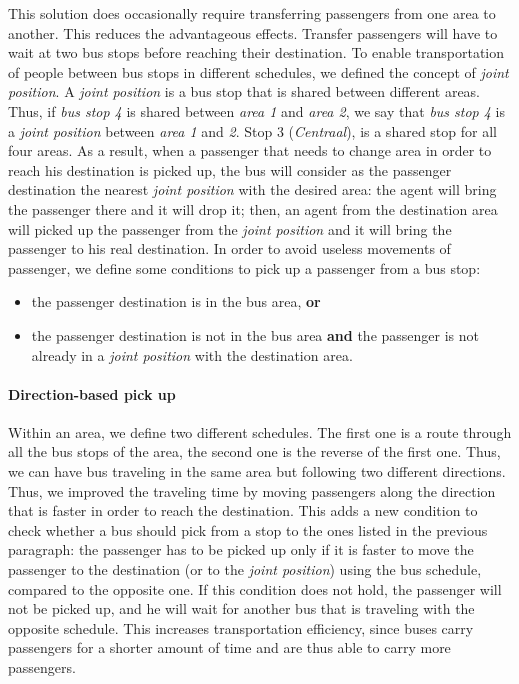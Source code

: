 This solution does occasionally require transferring passengers from one area to another. This reduces the advantageous effects. Transfer passengers will have to wait at two bus stops before reaching their destination. To enable transportation of people between bus stops in different schedules, we defined the concept of \textit{joint position}. A \textit{joint position} is a bus stop that is shared between different areas. Thus, if \textit{bus stop 4} is shared between \textit{area 1} and \textit{area 2}, we say that \textit{bus stop 4} is a \textit{joint position}  between \textit{area 1} and \textit{2}. Stop 3 (\textit{Centraal}), is a shared stop for all four areas. As a result, when a passenger that needs to change area in order to reach his destination is picked up, the bus will consider as the passenger destination the nearest \textit{joint position} with the desired area: the agent will bring the passenger there and it will drop it; then, an agent from the destination area will picked up the passenger from the \textit{joint position} and it will bring the passenger to his real destination. In order to avoid useless movements of passenger, we define some conditions to pick up a passenger from a bus stop:

\begin{itemize}
\item the passenger destination is in the bus area, \textbf{or}
\item the passenger destination is not in the bus area \textbf{and} the passenger is not already in a \textit{joint position} with the destination area.
\end{itemize}

\paragraph{Direction-based pick up}

Within an area, we define two different schedules. The first one is a route through all the bus stops of the area, the second one is the reverse of the first one. Thus, we can have bus traveling in the same area but following two different directions. Thus, we improved the traveling time by moving passengers along the direction that is faster in order to reach the destination. This adds a new condition to check whether a bus should pick from a stop to the ones listed in the previous paragraph: the passenger has to be picked up only if it is faster to move the passenger to the destination (or to the \textit{joint position}) using the bus schedule, compared to the opposite one. If this condition does not hold, the passenger will not be picked up, and he will wait for another bus that is traveling with the opposite schedule. This increases transportation efficiency, since buses carry passengers for a shorter amount of time and are thus able to carry more passengers. 

